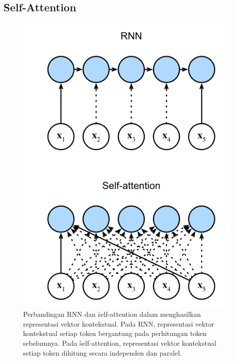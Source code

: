 	\subsection{\f{Self-Attention}}
	\begin{figure}
		\centering
		\includegraphics[width=1\textwidth]{assets/pics/rnn-compare-selfattention.png}
		\caption{Perbandingan RNN dan \f{self-attention} dalam menghasilkan representasi vektor kontekstual. Pada RNN, representasi vektor kontekstual setiap token bergantung pada perhitungan token sebelumnya. Pada \f{self-attention}, representasi vektor kontekstual setiap token dihitung secara independen dan paralel.}
		\label{fig:self-attention-rnn}
	\end{figure}

